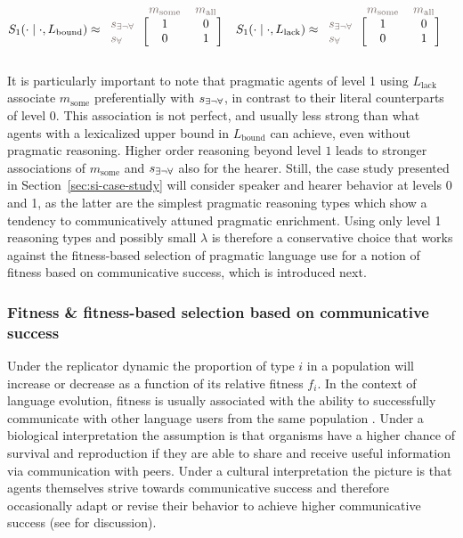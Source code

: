 \documentclass[a4paper, 11pt]{article}
\theoremstyle{Satz}
\newcommand{\state}{\ensuremath{s}\xspace}		%
\newcommand{\mystate}[1]{\ensuremath{\state_{\text{#1}}}\xspace} %
\newcommand{\mylang}[1]{\ensuremath{L_{\text{#1}}}\xspace} %
\newcommand{\messg}{\ensuremath{m}\xspace}		%
\newcommand{\mymessg}[1]{\ensuremath{\messg_{\text{#1}}}\xspace} %
\newcommand{\ssome}{\mystate{\ensuremath{\exists\neg\forall}}}
\newcommand{\sall}{\mystate{\ensuremath{\forall}}}
\newcommand{\msome}{\mymessg{some}}
\newcommand{\mall}{\mymessg{all}}
\newcommand{\Lbound}{\mylang{bound}}
\newcommand{\Llack}{\mylang{lack}}
\newcommand{\mygray}[1]{{\textcolor{mygray}{#1}}}
\begin{document}
\begin{align*}
  S_1(\cdot \mid \cdot, \Lbound) & \approx \begin{blockarray}{lcc}
    & \mygray{\msome} & \mygray{\mall} \\
    \begin{block}{l[cc]}
      \mygray{\ssome} & 1 & 0 \\
      \mygray{\sall}  & 0 & 1 \\
    \end{block}
  \end{blockarray} &
  S_1(\cdot \mid \cdot, \Llack) & \approx \begin{blockarray}{lcc}
    & \mygray{\msome} & \mygray{\mall} \\
    \begin{block}{l[cc]}
      \mygray{\ssome} & 1 & 0 \\
      \mygray{\sall}  & 0 & 1 \\
    \end{block}
  \end{blockarray} 
\end{align*}

It is particularly important to note that pragmatic agents of level 1 using $\Llack$ associate $\msome$
preferentially with $\ssome$, in contrast to their literal counterparts of level 0. This
association is not perfect, and usually less strong than what agents with a lexicalized upper
bound in $\Lbound$ can achieve, even without pragmatic reasoning. Higher order 
reasoning beyond level $1$ leads to stronger associations of $\msome$ and $\ssome$ also for the
hearer. Still, the case study presented in Section~\ref{sec:si-case-study} will consider
speaker and hearer behavior at levels 0 and 1, as the latter are the simplest pragmatic
reasoning types which show a tendency to communicatively attuned pragmatic enrichment. Using
only level 1 reasoning types and possibly small $\lambda$ is therefore a conservative choice that works against the
fitness-based selection of pragmatic language use for a notion of fitness based on
communicative success, which is introduced next.

\subsubsection{Fitness \& fitness-based selection based on communicative success}\label{sec:expressivity}

Under the replicator dynamic the proportion of type $i$ in a population will increase or
decrease as a function of its relative fitness $f_i$. In the context of language evolution,
fitness is usually associated with the ability to successfully communicate
with other language users from the same population
\citep[e.g.,][]{nowak+krakauer:1999,nowak+etal:2000, nowak+etal:2002}. Under a biological
interpretation the assumption is that organisms have a higher chance of survival and
reproduction if they are able to share and receive useful information via communication with
peers. Under a cultural interpretation the picture is that agents themselves strive towards
communicative success and therefore occasionally adapt or revise their behavior to achieve
higher communicative success (see \citealt[\S3.3]{benz+etal:2005b} for discussion).
\end{document}
